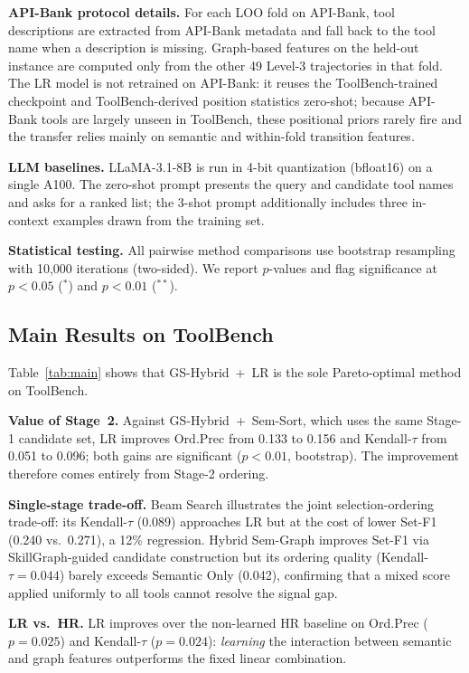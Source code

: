 \documentclass[lettersize,journal]{IEEEtran}
\begin{document}
\textbf{API-Bank protocol details.}
For each LOO fold on API-Bank, tool descriptions are extracted from API-Bank metadata and fall back to the tool name when a description is missing.
Graph-based features on the held-out instance are computed only from the other 49 Level-3 trajectories in that fold.
The LR model is not retrained on API-Bank: it reuses the ToolBench-trained checkpoint and ToolBench-derived position statistics zero-shot; because API-Bank tools are largely unseen in ToolBench, these positional priors rarely fire and the transfer relies mainly on semantic and within-fold transition features.

\textbf{LLM baselines.}
LLaMA-3.1-8B is run in 4-bit quantization (bfloat16) on a single A100.
The zero-shot prompt presents the query and candidate tool names and asks for a ranked list; the 3-shot prompt additionally includes three in-context examples drawn from the training set.

\textbf{Statistical testing.}
All pairwise method comparisons use bootstrap resampling with 10,000 iterations (two-sided).
We report $p$-values and flag significance at $p < 0.05$ ($^*$) and $p < 0.01$ ($^{**}$).

\subsection{Main Results on ToolBench}



Table~\ref{tab:main} shows that GS-Hybrid~+~LR is the sole Pareto-optimal method on ToolBench.

\textbf{Value of Stage~2.}
Against GS-Hybrid~+~Sem-Sort, which uses the same Stage-1 candidate set, LR improves Ord.Prec from 0.133 to 0.156 and Kendall-$\tau$ from 0.051 to 0.096; both gains are significant ($p < 0.01$, bootstrap).
The improvement therefore comes entirely from Stage-2 ordering.

\textbf{Single-stage trade-off.}
Beam Search illustrates the joint selection-ordering trade-off: its Kendall-$\tau$ (0.089) approaches LR but at the cost of lower Set-F1 (0.240 vs.\ 0.271), a 12\% regression.
Hybrid Sem-Graph improves Set-F1 via SkillGraph-guided candidate construction but its ordering quality (Kendall-$\tau = 0.044$) barely exceeds Semantic Only (0.042), confirming that a mixed score applied uniformly to all tools cannot resolve the signal gap.

\textbf{LR vs.\ HR.}
LR improves over the non-learned HR baseline on Ord.Prec ($p = 0.025$) and Kendall-$\tau$ ($p = 0.024$): \emph{learning} the interaction between semantic and graph features outperforms the fixed linear combination.
\end{document}
